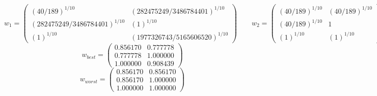 $$w_1 = \begin{pmatrix}
(40/189)^{1/10} & (282475249/3486784401)^{1/10}\\
(282475249/3486784401)^{1/10} & (1)^{1/10}\\
(1)^{1/10} & (1977326743/5165606520)^{1/10}
\end{pmatrix}
\qquad w_2 = \begin{pmatrix}
(40/189)^{1/10} & (40/189)^{1/10}\\
(40/189)^{1/10} & 1\\
(1)^{1/10} & (1)^{1/10}
\end{pmatrix}
$$
$$w_{best} = \begin{pmatrix}
0.856170 & 0.777778\\
0.777778 & 1.000000\\
1.000000 & 0.908439
\end{pmatrix}
$$
$$w_{worst} = \begin{pmatrix}
0.856170 & 0.856170\\
0.856170 & 1.000000\\
1.000000 & 1.000000
\end{pmatrix}
$$
